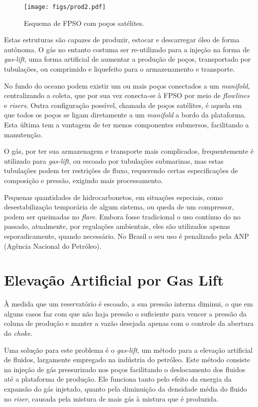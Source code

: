 \begin{figure}
\centering
  \texttt{[image: figs/prod2.pdf]}
  \caption{Esquema de FPSO com poços satélites.}
  \label{fig:fpso1}
\end{figure}





Estas estruturas são capazes de produzir, estocar e descarregar óleo de forma autônoma. O gás no entanto costuma ser re-utilizado para a injeção na forma de \textit{gas-lift}, uma forma artificial de aumentar a produção de poços, transportado por tubulações, ou comprimido e liquefeito para o armazenamento e transporte.

No fundo do oceano podem existir um ou mais poços conectados a um \textit{manifold}, centralizando a coleta, que por sua vez conecta-se à FPSO por meio de \textit{flowlines} e \textit{risers}. Outra configuração possível, chamada de poços satélites, é aquela em que todos os poços se ligam diretamente a um \textit{manifold} a bordo da plataforma. Esta última tem a vantagem de ter menos componentes submersos, facilitando a manutenção.


O gás, por ter sua armazenagem e transporte mais complicados, frequentemente é utilizado para \textit{gas-lift}, ou escoado por tubulações submarinas, mas estas tubulações podem ter restrições de fluxo, requerendo certas especificações de composição e pressão, exigindo mais processamento.

Pequenas quantidades de hidrocarbonetos, em situações especiais, como desestabilização temporária de algum sistema, ou queda de um compressor, podem ser queimadas no \textit{flare}. Embora fosse tradicional o uso contínuo do  no passado, atualmente, por regulações ambientais, eles são utilizados apenas esporadicamente, quando necessário. No Brasil o seu uso é penalizado pela ANP (Agência Nacional do Petróleo).



\section{Elevação Artificial por Gas Lift}

À medida que um reservatório é escoado, a sua pressão interna diminui, o que em alguns casos faz com que não haja pressão o suficiente para vencer a pressão da coluna de produção e manter a vazão desejada  apenas com o controle da abertura do \textit{choke}.
%

Uma solução para este problema é o \textit{gas-lift}, um método para a elevação artificial de fluidos, largamente empregado na indústria do petróleo.
%
Este método consiste na injeção de gás pressurizado nos poços facilitando o deslocamento dos fluidos até a plataforma de produção. 
%
Ele funciona tanto pelo efeito da energia da expansão do gás injetado, quanto pela diminuição da densidade média do fluido no \textit{riser}, causada pela mistura de mais gás à mistura que é produzida.
%



